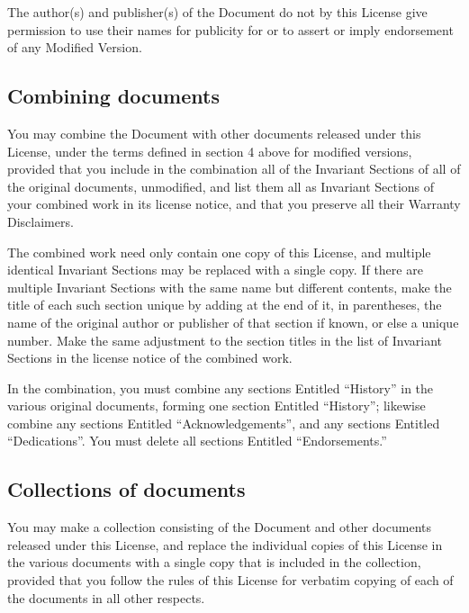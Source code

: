 {\tiny{}The author(s) and publisher(s) of the Document do not by this
License give permission to use their names for publicity for or to
assert or imply endorsement of any Modified Version.}{\tiny\par}

\subsection*{{\tiny{}Combining documents}}

{\tiny{}You may combine the Document with other documents released
under this License, under the terms defined in section 4 above for
modified versions, provided that you include in the combination all
of the Invariant Sections of all of the original documents, unmodified,
and list them all as Invariant Sections of your combined work in its
license notice, and that you preserve all their Warranty Disclaimers.}{\tiny\par}

{\tiny{}The combined work need only contain one copy of this License,
and multiple identical Invariant Sections may be replaced with a single
copy. If there are multiple Invariant Sections with the same name
but different contents, make the title of each such section unique
by adding at the end of it, in parentheses, the name of the original
author or publisher of that section if known, or else a unique number.
Make the same adjustment to the section titles in the list of Invariant
Sections in the license notice of the combined work.}{\tiny\par}

{\tiny{}In the combination, you must combine any sections Entitled
“History” in the various original documents, forming one section Entitled
“History”; likewise combine any sections Entitled “Acknowledgements”,
and any sections Entitled “Dedications”. You must delete all sections
Entitled “Endorsements.”}{\tiny\par}

\subsection*{{\tiny{}Collections of documents}}

{\tiny{}You may make a collection consisting of the Document and other
documents released under this License, and replace the individual
copies of this License in the various documents with a single copy
that is included in the collection, provided that you follow the rules
of this License for verbatim copying of each of the documents in all
other respects.}{\tiny\par}

